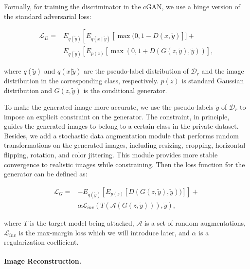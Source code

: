 \documentclass[letterpaper]{article} %
\begin{document}
	
Formally, for training the discriminator in the cGAN, we use a hinge version of the standard adversarial loss:
\begin{linenomath*}
\begin{equation}\label{eq:D_loss}
\begin{aligned}
\mathcal{L}_{D}=&E_{q(\tilde{y})}\left[E_{q(x \mid \tilde{y})}[\max (0,1-D(x, \tilde{y})]]+\right. \\
&E_{q(\tilde{y})}\left[E_{p(z)}[\max (0,1+D(G(z, \tilde{y}), \tilde{y}))],\right.
\end{aligned}
\end{equation}
\end{linenomath*}
where $q(\tilde{y})$ and $q(x|\tilde{y})$ are the pseudo-label distribution of \textbf{$\mathcal{D}_{r}$} and the image distribution in the corresponding class, respectively. $p(z)$ is standard Gaussian distribution and $G(z, \tilde{y})$ is the conditional generator.
	
To make the generated image more accurate, we use the pseudo-labels $\tilde{y}$ of $\mathcal{D}_r$ to impose an explicit constraint on the generator. The constraint, in principle, guides the generated images to belong to a certain class in the private dataset. Besides, we add a stochastic data augmentation module that performs random transformations on the generated images, including resizing, cropping, horizontal flipping, rotation, and color jittering. This module provides more stable convergence to realistic images while constraining. Then the loss function for the generator can be defined as:
\begin{linenomath*}
\begin{equation}\label{eq:G_loss}
\begin{aligned}
\mathcal{L}_{G} =& -E_{q(\tilde{y})}\left[E_{p(z)}\left[D(G(z, \tilde{y}), \tilde{y}))\right]\right] + \\
&\alpha \mathcal{L}_{inv}(T(\mathcal{A}(G(z, \tilde{y}))), \tilde{y}),
\end{aligned}
\end{equation}
\end{linenomath*}
where $T$ is the target model being attacked, $\mathcal{A}$ is a set of random augmentations, $\mathcal{L}_{inv}$ is the max-margin loss which we will introduce later, and $\alpha$ is a regularization coefficient.
	

\paragraph{Image Reconstruction.}
    
\end{document}

